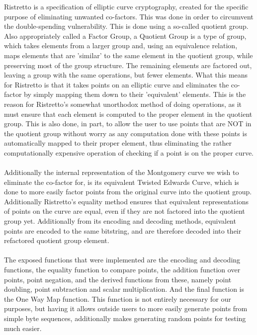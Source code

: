 \documentclass{article}
\begin{document}
Ristretto is a specification of elliptic curve cryptography, created for the specific purpose of eliminating unwanted co-factors. This was done in order to circumvent the double-spending vulnerability. This is done using a so-called quotient group. Also appropriately called a Factor Group, a Quotient Group is a type of group, which takes elements from a larger group and, using an equivalence relation, maps elements that are 'similar' to the same element in the quotient group, while preserving most of the group structure. The remaining elements are factored out, leaving a group with the same operations, but fewer elements. What this means for Ristretto is that it takes points on an elliptic curve and eliminates the co-factor by simply mapping them down to their 'equivalent' elements. This is the reason for Ristretto's somewhat unorthodox method of doing operations, as it must ensure that each element is computed to the proper element in the quotient group. This is also done, in part, to allow the user to use points that are NOT in the quotient group without worry as any computation done with these points is automatically mapped to their proper element, thus eliminating the rather computationally expensive operation of checking if a point is on the proper curve. 
\\\\
Additionally the internal representation of the Montgomery curve we wish to eliminate the co-factor for, is its equivalent Twisted Edwards Curve, which is done to more easily factor points from the original curve into the quotient group. Additionally Ristretto's equality method ensures that equivalent representations of points on the curve are equal, even if they are not factored into the quotient group yet. Additionally from its encoding and decoding methods, equivalent points are encoded to the same bitstring, and are therefore decoded into their refactored quotient group element.
\\\\
The exposed functions that were implemented are the encoding and decoding functions, the equality function to compare points, the addition function over points, point negation, and the derived functions from these, namely point doubling, point subtraction and scalar multiplication. And the final function is the One Way Map function. This function is not entirely necessary for our purposes, but having it allows outside users to more easily generate points from simple byte sequences, additionally makes generating random points for testing much easier. 
\end{document}

